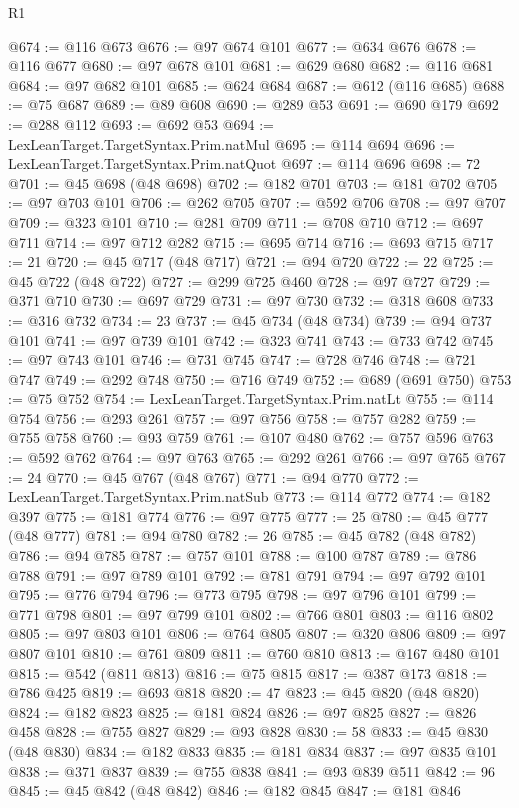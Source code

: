 \begin{lexlean}{R1}
\begin{coremodule}
@674 := @116 @673
@676 := @97 @674 @101
@677 := @634 @676
@678 := @116 @677
@680 := @97 @678 @101
@681 := @629 @680
@682 := @116 @681
@684 := @97 @682 @101
@685 := @624 @684
@687 := @612 (@116 @685)
@688 := @75 @687
@689 := @89 @608
@690 := @289 @53
@691 := @690 @179
@692 := @288 @112
@693 := @692 @53
@694 := LexLeanTarget.TargetSyntax.Prim.natMul
@695 := @114 @694
@696 := LexLeanTarget.TargetSyntax.Prim.natQuot
@697 := @114 @696
@698 := 72
@701 := @45 @698 (@48 @698)
@702 := @182 @701
@703 := @181 @702
@705 := @97 @703 @101
@706 := @262 @705
@707 := @592 @706
@708 := @97 @707
@709 := @323 @101
@710 := @281 @709
@711 := @708 @710
@712 := @697 @711
@714 := @97 @712 @282
@715 := @695 @714
@716 := @693 @715
@717 := 21
@720 := @45 @717 (@48 @717)
@721 := @94 @720
@722 := 22
@725 := @45 @722 (@48 @722)
@727 := @299 @725 @460
@728 := @97 @727
@729 := @371 @710
@730 := @697 @729
@731 := @97 @730
@732 := @318 @608
@733 := @316 @732
@734 := 23
@737 := @45 @734 (@48 @734)
@739 := @94 @737 @101
@741 := @97 @739 @101
@742 := @323 @741
@743 := @733 @742
@745 := @97 @743 @101
@746 := @731 @745
@747 := @728 @746
@748 := @721 @747
@749 := @292 @748
@750 := @716 @749
@752 := @689 (@691 @750)
@753 := @75 @752
@754 := LexLeanTarget.TargetSyntax.Prim.natLt
@755 := @114 @754
@756 := @293 @261
@757 := @97 @756
@758 := @757 @282
@759 := @755 @758
@760 := @93 @759
@761 := @107 @480
@762 := @757 @596
@763 := @592 @762
@764 := @97 @763
@765 := @292 @261
@766 := @97 @765
@767 := 24
@770 := @45 @767 (@48 @767)
@771 := @94 @770
@772 := LexLeanTarget.TargetSyntax.Prim.natSub
@773 := @114 @772
@774 := @182 @397
@775 := @181 @774
@776 := @97 @775
@777 := 25
@780 := @45 @777 (@48 @777)
@781 := @94 @780
@782 := 26
@785 := @45 @782 (@48 @782)
@786 := @94 @785
@787 := @757 @101
@788 := @100 @787
@789 := @786 @788
@791 := @97 @789 @101
@792 := @781 @791
@794 := @97 @792 @101
@795 := @776 @794
@796 := @773 @795
@798 := @97 @796 @101
@799 := @771 @798
@801 := @97 @799 @101
@802 := @766 @801
@803 := @116 @802
@805 := @97 @803 @101
@806 := @764 @805
@807 := @320 @806
@809 := @97 @807 @101
@810 := @761 @809
@811 := @760 @810
@813 := @167 @480 @101
@815 := @542 (@811 @813)
@816 := @75 @815
@817 := @387 @173
@818 := @786 @425
@819 := @693 @818
@820 := 47
@823 := @45 @820 (@48 @820)
@824 := @182 @823
@825 := @181 @824
@826 := @97 @825
@827 := @826 @458
@828 := @755 @827
@829 := @93 @828
@830 := 58
@833 := @45 @830 (@48 @830)
@834 := @182 @833
@835 := @181 @834
@837 := @97 @835 @101
@838 := @371 @837
@839 := @755 @838
@841 := @93 @839 @511
@842 := 96
@845 := @45 @842 (@48 @842)
@846 := @182 @845
@847 := @181 @846

\end{coremodule}
\end{lexlean}

